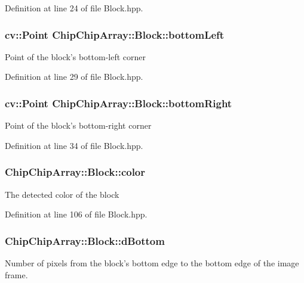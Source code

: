 Definition at line 24 of file Block.\+hpp.

\hypertarget{classChipChipArray_1_1Block_a78304b597a8d8a74a4d9b4bb561a7224}{
\subsubsection[{bottom\+Left}]{\setlength{\rightskip}{0pt plus 5cm}cv\+::\+Point Chip\+Chip\+Array\+::\+Block\+::bottom\+Left}}\label{classChipChipArray_1_1Block_a78304b597a8d8a74a4d9b4bb561a7224}
Point of the block's bottom-\/left corner 

Definition at line 29 of file Block.\+hpp.

\hypertarget{classChipChipArray_1_1Block_a82f831883d31e6d74be45b8851eefe96}{
\subsubsection[{bottom\+Right}]{\setlength{\rightskip}{0pt plus 5cm}cv\+::\+Point Chip\+Chip\+Array\+::\+Block\+::bottom\+Right}}\label{classChipChipArray_1_1Block_a82f831883d31e6d74be45b8851eefe96}
Point of the block's bottom-\/right corner 

Definition at line 34 of file Block.\+hpp.

\hypertarget{classChipChipArray_1_1Block_a262210a9a04028f3f2670c9ae38ef3d7}{
\subsubsection[{color}]{ Chip\+Chip\+Array\+::\+Block\+::color}}\label{classChipChipArray_1_1Block_a262210a9a04028f3f2670c9ae38ef3d7}
The detected color of the block 

Definition at line 106 of file Block.\+hpp.

\hypertarget{classChipChipArray_1_1Block_af3c4ecd0fd36763ac85c2dc0b57b8359}{
\subsubsection[{d\+Bottom}]{ Chip\+Chip\+Array\+::\+Block\+::d\+Bottom}}\label{classChipChipArray_1_1Block_af3c4ecd0fd36763ac85c2dc0b57b8359}
Number of pixels from the block's bottom edge to the bottom edge of the image frame. 

